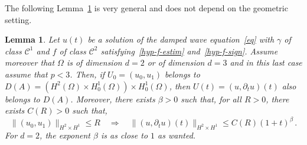 \documentclass[10pt]{amsart}
\newtheorem{lemm}[theo]{Lemma}\newtheorem{prop}[theo]{Proposition}\newtheorem{coro}[theo]{Corollary}\newtheorem{conj}[theo]{Conjecture}
\theoremstyle{definition}\newtheorem{defi}[theo]{Definition}\newtheorem{rema}[theo]{Remark}\newtheorem{exam}[theo]{Example}\newtheorem{exem}[theo]{Example}\newtheorem{nota}[theo]{Notation}
\newcommand{\Cc}{\mathcal{C}}
\begin{document}
The following Lemma~\ref{lemme-th-norm-H2} is very general and does not depend on the geometric setting.

\begin{lemm}\label{lemme-th-norm-H2}
Let $u(t)$ be a solution of the damped wave equation~\eqref{eq} with $\gamma$ of class $\Cc^1$ and $f$ of class $\Cc^2$ satisfying~\eqref{hyp-f-estim} and~\eqref{hyp-f-sign}. Assume moreover that $\Omega$ is of dimension $d=2$ or of dimension $d=3$ and in this last case assume that $p < 3$. Then, if $U_0=(u_0,u_1)$ belongs to $D(A)=(H^2(\Omega)\times H^1_0(\Omega))\times H^1_0(\Omega)$, then $U(t)=(u,\partial_t u)(t)$ also belongs to $D(A)$. Moreover, there exists $\beta>0$ such that, for all $R>0$, there exists $C(R)>0$ such that,
\[
\|(u_0,u_1)\|_{H^2\times H^1} \leq R\quad\Longrightarrow\quad\|(u,\partial_t
u)(t)\|_{H^2\times H^1} \leq C(R) (1+t)^\beta\,.
\]
For $d=2$, the exponent $\beta$ is as close to $1$ as wanted.
\end{lemm}
\end{document}
